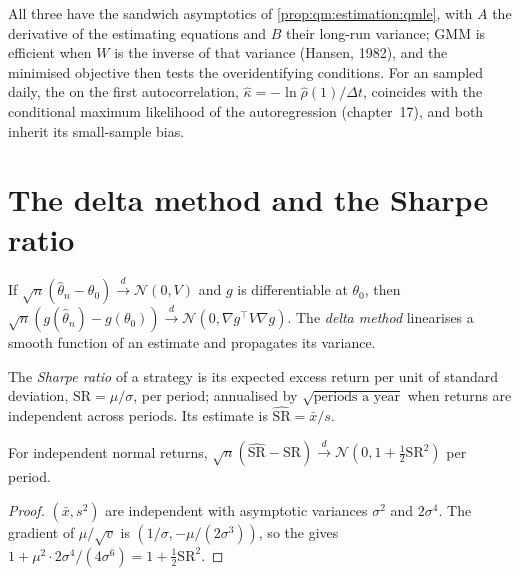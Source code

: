 All three have the sandwich asymptotics of \cref{prop:qm:estimation:qmle}, with $A$ the derivative of the estimating
equations and $B$ their long-run variance; GMM is efficient when $W$ is the inverse of that variance (Hansen, 1982),
and the minimised objective then tests the overidentifying conditions. For an  sampled
daily, the  on the first autocorrelation, $\hat\kappa = -\ln\hat\rho(1)/\Delta t$, coincides with the conditional
maximum likelihood of the autoregression (chapter~17), and both inherit its small-sample bias.

\section{The delta method and the Sharpe ratio}

\begin{method}\label{met:qm:estimation:delta}
If $\sqrt n(\hat\theta_n - \theta_0) \xrightarrow{d} \mathcal N(0, V)$ and $g$ is differentiable at $\theta_0$, then $\sqrt n(g(\hat\theta_n) - g(\theta_0))
\xrightarrow{d} \mathcal N(0, \nabla g^\top V\nabla g)$. The \emph{delta method} linearises a smooth function of
an estimate and propagates its variance.
\end{method}

\begin{definition}\label{def:qm:estimation:sharpe}
The \emph{Sharpe ratio} of a strategy is its expected excess return per unit of standard deviation,
$\mathrm{SR} = \mu/\sigma$, per period; annualised by $\sqrt{\text{periods a year}}$ when returns are independent across periods. Its
estimate is $\widehat{\mathrm{SR}} = \bar x/s$.
\end{definition}

\begin{proposition}\label{prop:qm:estimation:srse}
For independent normal returns, $\sqrt n(\widehat{\mathrm{SR}} - \mathrm{SR}) \xrightarrow{d} \mathcal N(0, 1 + \tfrac12\mathrm{SR}^2)$ per period.
\end{proposition}

\begin{proof}
$(\bar x, s^2)$ are independent with asymptotic variances $\sigma^2$ and $2\sigma^4$. The gradient of $\mu/\sqrt v$ is $(1/\sigma,
-\mu/(2\sigma^3))$, so the  gives $1 + \mu^2\cdot2\sigma^4/(4\sigma^6) = 1 + \tfrac12\mathrm{SR}^2$.
\end{proof}

